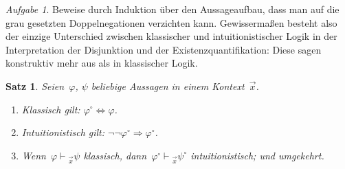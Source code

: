 \documentclass[a4paper,ngerman,12pt]{scrartcl}
\theoremstyle{definition}
\theoremstyle{plain}
\newtheorem{satz}[defn]{Satz}
\theoremstyle{remark}
\newtheorem{aufg}[defn]{Aufgabe}
\newcommand{\seq}[1]{\mathrel{\vdash\!\!\!_{#1}}}
\renewcommand{\_}{\mathpunct{.}\,}
\newcommand{\?}{\,{:}\,}
\begin{document}
\begin{aufg}Beweise durch Induktion über den Aussageaufbau, dass man auf die grau
gesetzten Doppelnegationen verzichten kann. Gewissermaßen besteht also der
einzige Unterschied zwischen klassischer und intuitionistischer Logik in der
Interpretation der Disjunktion und der Existenzquantifikation: Diese sagen
konstruktiv mehr aus als in klassischer Logik.\end{aufg}

\begin{satz}\label{dnt:proof}Seien~$\varphi$, $\psi$ beliebige Aussagen in einem Kontext~$\vec x$.
\begin{enumerate}
\item Klassisch gilt: $\varphi^\circ \Longleftrightarrow \varphi$.
\item Intuitionistisch gilt: $\neg\neg\varphi^\circ \Longrightarrow
\varphi^\circ$.
\item Wenn~$\varphi \seq{\vec x} \psi$ klassisch, dann~$\varphi^\circ \seq{\vec
x} \psi^\circ$ intuitionistisch; und umgekehrt.
\end{enumerate}
\end{satz}
\end{document}
